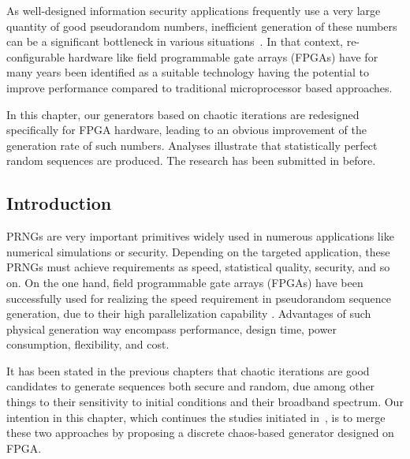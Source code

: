 As well-designed information security 
applications frequently use a very large quantity of good 
pseudorandom numbers, inefficient generation of 
these numbers can be a significant bottleneck 
in various situations~\cite{Porter198443,Batina20031,Carroll1990613,Liu2012331}. 
In that context, re-configurable hardware like field programmable gate arrays (FPGAs)
 have for many years been identified as a suitable technology having the potential to improve performance compared to traditional microprocessor based approaches. 

In this chapter, %
our generators based on chaotic 
iterations are redesigned specifically for FPGA hardware, 
leading to an obvious improvement of the 
generation rate of such numbers. Analyses illustrate that 
statistically perfect random sequences 
are produced.
The research has been submitted in \cite{submit1, submit3} before.

\subsection{Introduction}
PRNGs are very important primitives widely used 
in numerous applications like numerical simulations or security.
Depending on the targeted application, these PRNGs must achieve requirements
as speed, statistical quality, security, and so on. 
On the one hand, field programmable gate arrays (FPGAs) have been successfully used for realizing 
the speed requirement in pseudorandom sequence generation, due to their high parallelization capability \cite{Bojani200663, Danger:2009:HST:1645457.1645933, Tsoi:2003:CFT:938383.938400}. Advantages of such physical generation way encompass performance, design time, power consumption, flexibility, and cost.


It has been stated in the previous chapters that chaotic iterations are
good candidates to generate  sequences both secure and random,
due among other things to
their sensitivity to initial conditions and their broadband spectrum. 
Our intention in this chapter, which continues the studies initiated 
in~\cite{DBLP:journals/corr/abs-1112-5239}, is to merge these two approaches by
proposing a discrete chaos-based generator
designed on FPGA.


